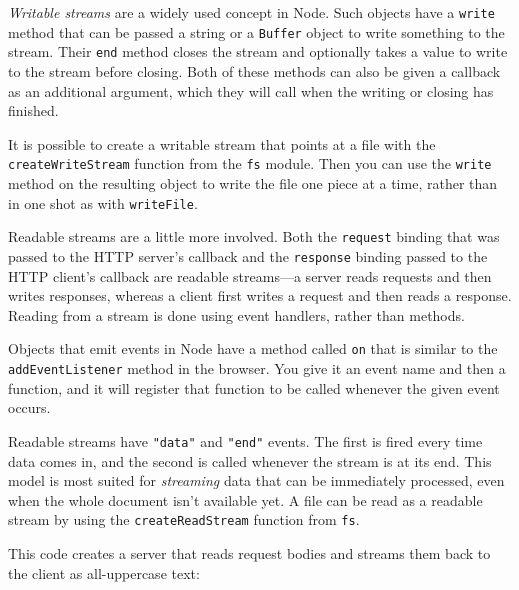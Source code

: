 \emph{Writable streams} are a widely used concept in Node. Such objects have a \lstinline`write` method that can be passed a string or a \lstinline`Buffer` object to write something to the stream. Their \lstinline`end` method closes the stream and optionally takes a value to write to the stream before closing. Both of these methods can also be given a callback as an additional argument, which they will call when the writing or closing has finished.

It is possible to create a writable stream that points at a file with the \lstinline`createWriteStream` function from the \lstinline`fs` module. Then you can use the \lstinline`write` method on the resulting object to write the file one piece at a time, rather than in one shot as with \lstinline`writeFile`.

Readable streams are a little more involved. Both the \lstinline`request` binding that was passed to the HTTP server's callback and the \lstinline`response` binding passed to the HTTP client's callback are readable streams—a server reads requests and then writes responses, whereas a client first writes a request and then reads a response. Reading from a stream is done using event handlers, rather than methods.

Objects that emit events in Node have a method called \lstinline`on` that is similar to the \lstinline`addEventListener` method in the browser. You give it an event name and then a function, and it will register that function to be called whenever the given event occurs.

Readable streams have \lstinline`"data"` and \lstinline`"end"` events. The first is fired every time data comes in, and the second is called whenever the stream is at its end. This model is most suited for \emph{streaming} data that can be immediately processed, even when the whole document isn't available yet. A file can be read as a readable stream by using the \lstinline`createReadStream` function from \lstinline`fs`.

This code creates a server that reads request bodies and streams them back to the client as all-uppercase text:

